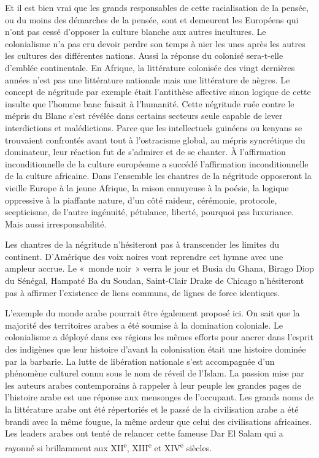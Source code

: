 \documentclass[french,twoside]{book} %
\begin{document}
\bigbreak
\noindent Et il est bien vrai que les grands responsables de cette racialisation de la pensée, ou du moins des démarches de la pensée, sont et demeurent les Européens qui n’ont pas cessé d’opposer la culture blanche aux autres incultures. Le colonialisme n’a pas cru devoir perdre son temps à nier les unes après les autres les cultures des différentes nations. Aussi la réponse du colonisé   sera-t-elle d’emblée continentale. En Afrique, la littérature colonisée des vingt dernières années n’est pas une littérature nationale mais une littérature de nègres. Le concept de négritude par exemple était l’antithèse affective sinon logique de cette insulte que l’homme banc faisait à l’humanité. Cette négritude ruée contre le mépris du Blanc s’est révélée dans certains secteurs seule capable de lever interdictions et malédictions. Parce que les intellectuels guinéens ou kenyans se trouvaient confrontés avant tout à l’ostracisme global, au mépris syncrétique du dominateur, leur réaction fut de s’admirer et de se chanter. À l’affirmation inconditionnelle de la culture européenne a succédé l’affirmation inconditionnelle de la culture africaine. Dans l’ensemble les chantres de la négritude opposeront la vieille Europe à la jeune Afrique, la raison ennuyeuse à la poésie, la logique oppressive à la piaffante nature, d’un côté raideur, cérémonie, protocole, scepticisme, de l’autre ingénuité, pétulance, liberté, pourquoi pas luxuriance. Mais aussi irresponsabilité.\par
\bigbreak
\noindent Les chantres de la négritude n’hésiteront pas à transcender les limites du continent. D’Amérique des voix noires vont reprendre cet hymne avec une ampleur accrue. Le « monde noir » verra le jour et Busia du Ghana, Birago Diop du Sénégal, Hampaté Ba du Soudan, Saint-Clair Drake de Chicago n’hésiteront pas à affirmer l’existence de liens communs, de lignes de force identiques.\par
L’exemple du monde arabe pourrait être également proposé ici. On sait que la majorité des territoires arabes a été soumise à la domination coloniale. Le colonialisme a déployé dans ces régions les mêmes efforts pour ancrer dans l’esprit des indigènes que leur histoire d’avant la colonisation était une histoire dominée par la barbarie. La lutte de libération nationale s’est accompagnée d’un phénomène culturel connu sous le nom de réveil de l’Islam. La passion mise par les auteurs arabes contemporains à rappeler à leur peuple les grandes pages de l’histoire arabe est une réponse aux mensonges de l’occupant. Les grands noms de la littérature arabe ont été répertoriés et le passé de la   civilisation arabe a été brandi avec la même fougue, la même ardeur que celui des civilisations africaines. Les leaders arabes ont tenté de relancer cette fameuse Dar El Salam qui a rayonné si brillamment aux XII\textsuperscript{e}, XIII\textsuperscript{e} et XIV\textsuperscript{e} siècles.\par
\end{document}
